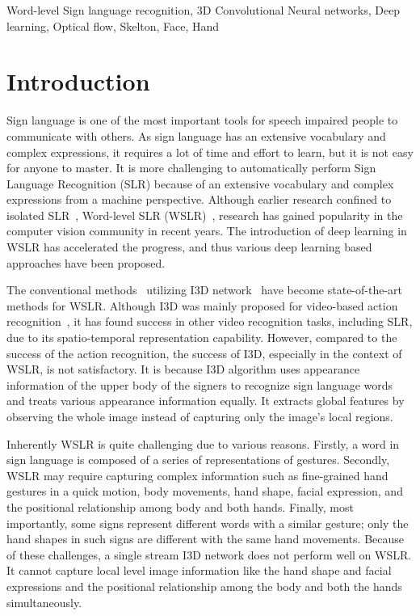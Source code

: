 \documentclass[journal]{IEEEtran}
\begin{document}
\begin{IEEEkeywords}
Word-level Sign language recognition, 3D Convolutional Neural networks, Deep learning, Optical flow, Skelton, Face, Hand
\end{IEEEkeywords}



\newcommand{\etal}{\textit{et al}.}


\IEEEpeerreviewmaketitle



\section{Introduction}
Sign language is one of the most important tools for speech impaired people to communicate with others. As sign language has an extensive vocabulary and complex expressions, it requires a lot of time and effort to learn, but it is not easy for anyone to master. It is more challenging to automatically perform Sign Language Recognition (SLR) because of an extensive vocabulary and complex expressions from a machine perspective. Although earlier research confined to isolated SLR~\cite{li2020transferring, wang2014similarity}, Word-level SLR (WSLR)~\cite{Hosain_2021_WACV,Camgoz_2020_CVPR}, research has gained popularity in the computer vision community in recent years. The introduction of deep learning in WSLR has accelerated the progress, and thus various deep learning based approaches have been proposed.

The conventional methods~\cite{li2020word, vaezi2019ms-asl} utilizing I3D network~\cite{joao2017i3d} have become state-of-the-art methods for WSLR. Although I3D was mainly proposed for video-based action recognition~\cite{joao2017i3d}, it has found success in other video recognition tasks, including SLR, due to its spatio-temporal representation capability. However, compared to the success of the action recognition, the success of I3D, especially in the context of WSLR, is not satisfactory. It is because I3D algorithm uses appearance information of  the upper body of the signers to recognize sign language words and treats various appearance information equally. It extracts global features by observing the whole image instead of capturing only the image's local regions.

Inherently WSLR is quite challenging due to various reasons. Firstly, a word in sign language is composed of a series of representations of gestures. Secondly, WSLR may require capturing complex information such as fine-grained hand gestures in a quick motion, body movements, hand shape, facial expression, and the positional relationship among body and both hands. Finally, most importantly, some signs represent different words with a similar gesture; only the hand shapes in such signs are different with the same hand movements. Because of these challenges, a single stream I3D network does not perform well on WSLR. It cannot capture local level image information like the hand shape and facial expressions and the positional relationship among the body and both the hands simultaneously.
\end{document}
